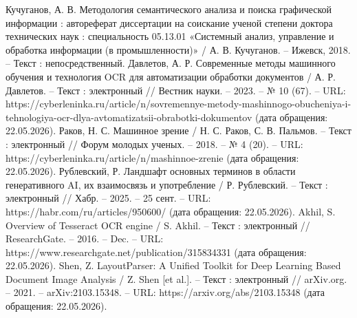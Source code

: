 Кучуганов, А. В. Методология семантического анализа и поиска графической информации : автореферат диссертации на соискание ученой степени доктора технических наук : специальность 05.13.01 «Системный анализ, управление и обработка информации (в промышленности)» / А. В. Кучуганов. – Ижевск, 2018. – Текст : непосредственный.
Давлетов, А. Р. Современные методы машинного обучения и технология OCR для автоматизации обработки документов / А. Р. Давлетов. – Текст : электронный // Вестник науки. – 2023. – № 10 (67). – URL: https://cyberleninka.ru/article/n/sovremennye-metody-mashinnogo-obucheniya-i-tehnologiya-ocr-dlya-avtomatizatsii-obrabotki-dokumentov (дата обращения: 22.05.2026).
Раков, Н. С. Машинное зрение / Н. С. Раков, С. В. Пальмов. – Текст : электронный // Форум молодых ученых. – 2018. – № 4 (20). – URL: https://cyberleninka.ru/article/n/mashinnoe-zrenie (дата обращения: 22.05.2026).
Рублевский, Р. Ландшафт основных терминов в области генеративного AI, их взаимосвязь и употребление / Р. Рублевский. – Текст : электронный // Хабр. – 2025. – 25 сент. – URL: https://habr.com/ru/articles/950600/ (дата обращения: 22.05.2026).
Akhil, S. Overview of Tesseract OCR engine / S. Akhil. – Текст : электронный // ResearchGate. – 2016. – Dec. – URL: https://www.researchgate.net/publication/315834331 (дата обращения: 22.05.2026).
Shen, Z. LayoutParser: A Unified Toolkit for Deep Learning Based Document Image Analysis / Z. Shen [et al.]. – Текст : электронный // arXiv.org. – 2021. – arXiv:2103.15348. – URL: https://arxiv.org/abs/2103.15348 (дата обращения: 22.05.2026).